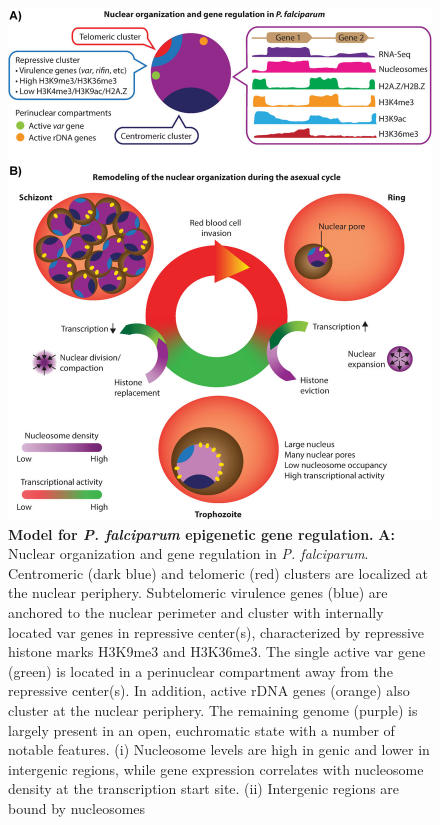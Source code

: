 \begin{figure}
\begin{center}
\includegraphics[width=\linewidth]{figures/fig4.png}
\end{center}
\caption{\textbf{Model for \textit{P. falciparum} epigenetic gene regulation.}
 \textbf{A:} Nuclear organization and gene regulation in \textit{P. falciparum}. Centromeric
 (dark blue) and telomeric (red) clusters are localized at the nuclear
 periphery. Subtelomeric virulence genes (blue) are anchored to the nuclear
 perimeter and cluster with internally located var genes in repressive
 center(s), characterized by repressive histone marks H3K9me3 and H3K36me3.
 The single active var gene (green) is located in a perinuclear compartment
 away from the repressive center(s). In addition, active rDNA genes (orange)
 also cluster at the nuclear periphery. The remaining genome (purple) is
 largely present in an open, euchromatic state with a number of notable
 features. (i) Nucleosome levels are high in genic and lower in intergenic
 regions, while gene expression correlates with nucleosome density at the
 transcription start site. (ii) Intergenic regions are bound by nucleosomes
}
\end{figure}
